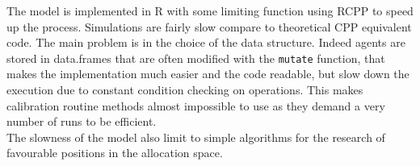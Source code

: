 \documentclass[a4paper,twoside, justified,marginals=raggedright]{tufte-handout}
\begin{document}
The model is implemented in R with some limiting function using RCPP to speed up the process. Simulations are fairly slow compare to theoretical CPP equivalent code. The main problem is in the choice of the data structure. Indeed agents are stored in data.frames that are often modified with the \verb|mutate| function, that makes the implementation much easier and the code readable, but slow down the execution due to constant condition checking on operations. This makes calibration routine methods almost impossible to use as they demand a very number of runs to be efficient.\\
\indent The slowness of the model also limit to simple algorithms for the research of favourable positions in the allocation space.
%
%
%
%
\end{document}
